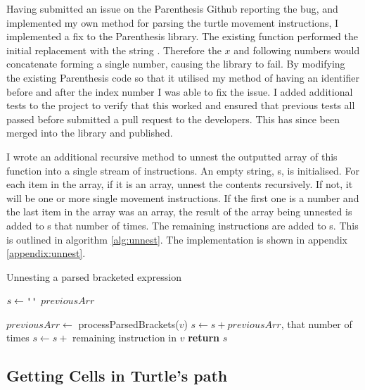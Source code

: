 Having submitted an issue on the Parenthesis Github reporting the bug, and implemented my own method for parsing the turtle movement instructions, I implemented a fix to the Parenthesis library. The existing function performed the initial replacement with the string . Therefore the $x$ and following numbers would concatenate forming a single number, causing the library to fail. By modifying the existing Parenthesis code so that it utilised my method of having an identifier before and after the index number I was able to fix the issue. I added additional tests to the project to verify that this worked and ensured that previous tests all passed before submitted a pull request to the developers. This has since been merged into the library and published.

I wrote an additional recursive method to unnest the outputted array of this function into a single stream of instructions. An empty string, s, is initialised. For each item in the array, if it is an array, unnest the contents recursively. If not, it will be one or more single movement instructions. If the first one is a number and the last item in the array was an array, the result of the array being unnested is added to s that number of times. The remaining instructions are added to s. This is outlined in algorithm \ref{alg:unnest}. The implementation is shown in appendix \ref{appendix:unnest}.

\begin{algorithm}[!htbp]
\caption{Unnesting a parsed bracketed expression}
\label{alg:unnest}
\begin{algorithmic}[1]

   \State $s\gets \texttt{\upquote{}}$
   \State $previousArr$

     \State $previousArr \gets$ processParsedBrackets($v$)
    \Else
        \State $s \gets s + previousArr$, that number of times
       \EndIf
       \State $s \gets s + $ remaining instruction in $v$
    \EndIf
   \EndFor
   \State \textbf{return} $s$

\EndProcedure
\end{algorithmic}
\end{algorithm}

\subsection{Getting Cells in Turtle's path}

